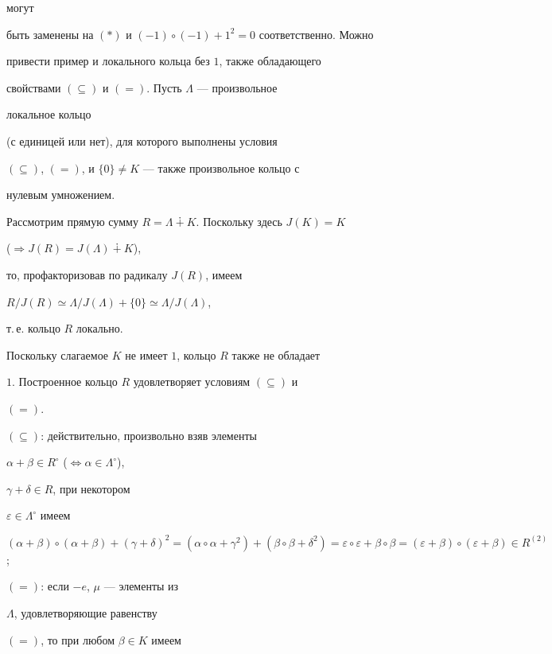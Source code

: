 могут 


быть заменены на $(*)$ и $(-1)\circ(-1)+1^2=0$ соответственно. Можно 


привести пример и локального кольца без $1$, также обладающего 


свойствами $(\subseteq)$ и $(=)$. Пусть $\Lambda$ --- произвольное 


локальное кольцо 


(с единицей или нет), для которого выполнены условия 


$(\subseteq)$, $(=)$, и $\{0\}\ne K$ --- также произвольное кольцо с 


нулевым умножением. 


Рассмотрим прямую сумму $R=\Lambda\dotplus K$. Поскольку здесь $J(K)=K$ 


($\Rightarrow J(R)=J(\Lambda)\dotplus K$), 


то, профакторизовав по радикалу $J(R)$, имеем 


$R/J(R)\simeq\Lambda/J(\Lambda)+\{0\}\simeq\Lambda/J(\Lambda)$, 


т.\,е. кольцо $R$ локально. 


Поскольку слагаемое $K$ не имеет $1$, кольцо $R$ также не обладает 


$1$. Построенное кольцо $R$ удовлетворяет условиям $(\subseteq)$ и 


$(=)$. 


 


$(\subseteq)$: действительно, произвольно взяв элементы 


$\alpha+\beta\in R^\circ$ ($\Leftrightarrow\alpha\in\Lambda^\circ$), 


$\gamma+\delta\in R$, при некотором 


$\varepsilon\in\Lambda^\circ$ имеем 


$(\alpha+\beta)\circ(\alpha+\beta)+(\gamma+\delta)^2= 


(\alpha\circ\alpha+\gamma^2)+(\beta\circ\beta+\delta^2)= 


\varepsilon\circ\varepsilon+\beta\circ\beta= 


(\varepsilon+\beta)\circ(\varepsilon+\beta)\in R^{(2)}$; 


 


$(=)$: если $-e$, $\mu$ --- элементы из 


$\Lambda$, удовлетворяющие равенству 


$(=)$, то при любом $\beta\in K$ имеем 


